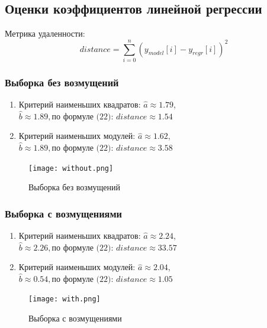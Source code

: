 \documentclass[a4paper]{article}
\begin{document}
\subsection{Оценки коэффициентов линейной регрессии}
    \noindent Метрика удаленности:
	\begin{equation}
	 distance = \sum_{i=0}^{n}(y_{model}[i]-y_{regr}[i])^2
        \end{equation}
	
	\subsubsection{Выборка без возмущений}
		\begin{enumerate}
			\item{Критерий наименьших квадратов:}
			$\hat{a}\approx 1.79$, $\hat{b}\approx 1.89, \text{по формуле (22): } distance \approx 1.54$
			\item{Критерий наименьших модулей:}
			$\hat{a}\approx 1.62$, $\hat{b}\approx 1.89, \text{по формуле (22): } distance \approx 3.58$
		\end{enumerate}
		\begin{figure}[H]
			\centering
			\texttt{[image: without.png]}
			\caption{Выборка без возмущений}
			\label{w/o_pert}
		\end{figure}
	
	\subsubsection{Выборка с возмущениями}
		\begin{enumerate}
			\item{Критерий наименьших квадратов:}
			$\hat{a}\approx 2.24$, $\hat{b}\approx 2.26, \text{по формуле (22): } distance \approx 33.57$
			\item{Критерий наименьших модулей:}
			$\hat{a}\approx 2.04$, $\hat{b}\approx 0.54, \text{по формуле (22): } distance \approx 1.05$
		\end{enumerate}
		\begin{figure}[H]
			\centering
			\texttt{[image: with.png]}
			\caption{Выборка с возмущениями}
			\label{w_pert}
		\end{figure}
  
\end{document}

